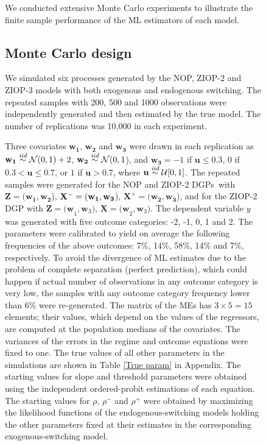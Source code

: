 \documentclass[letterpaper,fleqn,12pt]{article}
\begin{document}
\begin{figure}[H]
\begin{onehalfspace}
We conducted extensive Monte Carlo experiments to illustrate the finite
sample performance of the ML estimators of each model.

\subsection{Monte Carlo design}

We simulated six processes generated by the NOP, ZIOP-2 and ZIOP-3 models
with both exogenous and endogenous switching. The repeated samples with 200,
500 and 1000 observations were independently generated and then estimated by
the true model. The number of replications was 10,000 in each experiment.

Three covariates $\mathbf{w}_{\mathbf{1}}$, $\mathbf{w}_{\mathbf{2}}$ and $%
\mathbf{w}_{\mathbf{3}}$ were drawn in each replication as\noindent\ $%
\mathbf{w}_{\mathbf{1}}\overset{\emph{iid}}{\sim }\mathcal{N}(0,1)+2$, $%
\mathbf{w}_{\mathbf{2}}\overset{\emph{iid}}{\sim }\mathcal{N}(0,1$), and $%
\mathbf{w}_{\mathbf{3}}=-1$ if $\mathbf{u}\leq 0.3$, $0$ if $0.3<\mathbf{u}%
\leq 0.7$, or $1$ if $\mathbf{u}>0.7$, where $\mathbf{u}\overset{\emph{iid}}{%
\sim }\mathcal{U}[0,1]$. The repeated samples were generated for the NOP and
ZIOP-2 DGPs\textit{\ }with $\mathbf{Z=(w_{1}},\mathbf{w_{2}}$), $\mathbf{%
\mathbf{X}^{-}=(w_{1}},\mathbf{w_{3}}$), $\mathbf{\mathbf{X}^{+}=(w_{2}},%
\mathbf{w_{3}}$), and for the ZIOP-2 DGP with $\mathbf{Z=(w}_{1},\mathbf{w}%
_{3})$, $\mathbf{\mathbf{X}=(w}_{2},\mathbf{w}_{3})$. The dependent variable 
$y$ was generated with five outcome categories: -2, -1, 0, 1 and 2. The
parameters were calibrated to yield on average the following frequencies of
the above outcomes: 7\%, 14\%, 58\%, 14\% and 7\%, respectively. To avoid
the divergence of ML estimates due to the problem of complete separation
(perfect prediction), which could happen if actual number of observations in
any outcome category is very low, the samples with any outcome category
frequency lower than 6\% were re-generated. The matrix of the MEs has $%
3\times 5=15$ elements; their values, which depend on the values of the
regressors, are computed at the population medians of the covariates. The
variances of the errors in the regime and outcome equations were fixed to
one. The true values of all other parameters in the simulations are shown in
Table \ref{True param} in Appendix. The starting values for slope and
threshold parameters were obtained using the independent ordered-probit
estimations of each equation. The starting values for $\rho $, $\rho ^{-}$
and $\rho ^{+}$ were obtained by maximizing the likelihood functions of the
endogenous-switching models holding the other parameters fixed at their
estimates in the corresponding exogenous-switching model.


\end{onehalfspace}
\end{figure}
\end{document}
